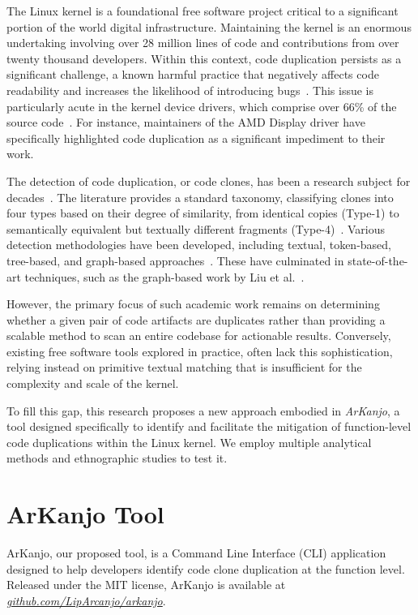 \documentclass[conference]{IEEEtran}
\begin{document}
The Linux kernel is a foundational free software project 
critical to a significant portion of the world digital infrastructure. Maintaining 
the kernel is an enormous undertaking involving over 28 million lines of code 
and contributions from over twenty thousand developers. Within this context, code 
duplication persists as a significant challenge, a known harmful practice that 
negatively affects code readability and increases the likelihood of introducing
bugs~\cite{harmone,harmtwo}. This issue is particularly acute in the 
kernel device drivers, which comprise over 66\% of the source code~\cite{marcelo}. 
For instance, maintainers of the AMD Display driver have specifically highlighted code 
duplication as a significant impediment to their work.

The detection of code duplication, or code clones, has been a research subject for 
decades~\cite{firstman}. The literature provides a standard taxonomy, classifying 
clones into four types based on their degree of similarity, from identical copies 
(Type-1) to semantically equivalent but textually different fragments (Type-4)~\cite{litreview}. 
Various detection methodologies have been developed, including textual, token-based, 
tree-based, and graph-based approaches~\cite{litreview}. These have culminated in 
state-of-the-art techniques, such as the graph-based work by Liu et al.~\cite{tailor}.

However, the primary focus of such academic work remains on determining whether a given 
pair of code artifacts are duplicates rather than providing a scalable method to scan 
an entire codebase for actionable results. Conversely, existing free software tools explored 
in practice, often lack this sophistication, relying instead on primitive textual matching 
that is insufficient for the complexity and scale of the kernel.

To fill this gap, this research proposes a new approach embodied in \textit{ArKanjo}, a tool 
designed specifically to identify and facilitate the mitigation of function-level code 
duplications within the Linux kernel. We employ multiple analytical 
methods and ethnographic studies to test it.


\section{ArKanjo Tool}

ArKanjo, our proposed tool, is a Command Line Interface (CLI) application designed to
help developers identify code clone duplication at the function level. Released under the
MIT license, ArKanjo is available at \textit{\url{github.com/LipArcanjo/arkanjo}}.
\end{document}
